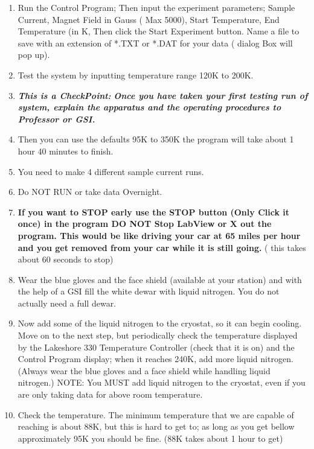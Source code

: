 \documentclass{../lab}
\begin{document}
\begin{enumerate}
    \item Run the Control Program; Then input the experiment parameters; Sample Current, Magnet Field in Gauss ( Max 5000), Start Temperature, End Temperature (in K, Then click the Start Experiment button. Name a file to save with an extension of *.TXT or *.DAT for your data ( dialog Box will pop up).

    \item Test the system by inputting temperature range 120K to 200K.
    
    \item \textbf{}\emph{\textbf{This is a CheckPoint:}} \emph{\textbf{Once you have taken your first testing run of system, explain the apparatus and the operating procedures to Professor or GSI.}}

    \item Then you can use the defaults 95K to 350K the program will take about 1 hour 40 minutes to finish.

    \item You need to make 4 different sample current runs.

    \item Do NOT RUN or take data Overnight.

    \item \textbf{If you want to STOP early use the STOP button (Only Click it once) in the program DO NOT Stop LabView or X out the program. This would be like driving your car at 65 miles per hour and you get removed from your car while it is still going.} ( this takes about 60 seconds to stop)

    \item Wear the blue gloves and the face shield (available at your station) and with the help of a GSI fill the white dewar with liquid nitrogen. You do not actually need a full dewar.

    \item Now add some of the liquid nitrogen to the cryostat, so it can begin cooling. Move on to the next step, but periodically check the temperature displayed by the Lakeshore 330 Temperature Controller (check that it is on) and the Control Program display; when it reaches 240K, add more liquid nitrogen.(Always wear the blue gloves and a face shield while handling liquid nitrogen.) NOTE: You MUST add liquid nitrogen to the cryostat, even if you are only taking data for above room temperature.

    \item Check the temperature. The minimum temperature that we are capable of reaching is about 88K, but this is hard to get to; as long as you get bellow approximately 95K you should be fine. (88K takes about 1 hour to get)


\end{enumerate}
\end{document}
